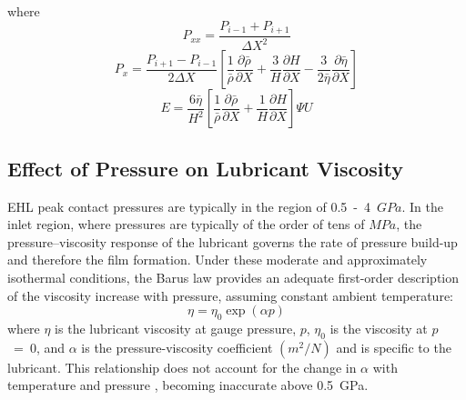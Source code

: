 where
\begin{equation}\label{eq3.21}
	P_{x x}=\frac{P_{i-1}+P_{i+1}}{\Delta X^2}
\end{equation}
\begin{equation}\label{eq3.22}
	P_{x}=\frac{P_{i+1}-P_{i-1}}{2 \Delta X}\left[\frac{1}{\bar{\rho}} \frac{\partial \bar{\rho}}{\partial X}+\frac{3}{H} \frac{\partial H}{\partial X}-\frac{3}{2 \bar{\eta}} \frac{\partial \bar{\eta}}{\partial X}\right]
\end{equation}
\begin{equation}\label{eq3.23}
	E=\frac{6 \bar{\eta}}{H^2}\left[\frac{1}{\bar{\rho}} \frac{\partial \bar{\rho}}{\partial X}+\frac{1}{H} \frac{\partial H}{\partial X}\right] \Psi U
\end{equation}

\subsection{Effect of Pressure on Lubricant Viscosity}

EHL peak contact pressures are typically in the region of 0.5~-~4~$GPa$. In the inlet region, where pressures are typically of the order of tens of $MPa$, the pressure–viscosity response of the lubricant governs the rate of pressure build-up and therefore the film formation. Under these moderate and approximately isothermal conditions, the Barus law \cite{Barus1893} provides an adequate first-order description of the viscosity increase with pressure, assuming constant ambient temperature: 
\begin{equation}\label{eq3.24}
	\eta=\eta_0 \exp (\alpha p)
\end{equation}
where $\eta$ is the lubricant viscosity at gauge pressure, $p$, $\eta_0$ is the viscosity at $p$~=~0, and $\alpha$ is the pressure-viscosity coefficient $({m}^2 /{N})$ and is specific to the lubricant. This relationship does not account for the change in $\alpha$ with temperature and pressure \cite{Gohar2019}, becoming inaccurate above 0.5~GPa.

